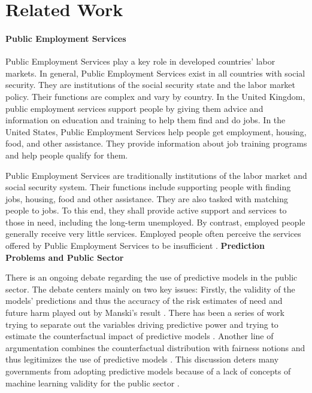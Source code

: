 \documentclass{article} %
\begin{document}
\section{Related Work}

\label{sec:relatedwork}
\paragraph{Public Employment Services}
Public Employment Services play a key role in developed countries' labor markets. In general, Public Employment Services exist in all countries with social security. They are institutions of the social security state and the labor market policy. Their functions are complex and vary by country. In the United Kingdom, public employment services support people by giving them advice and information on education and training to help them find and do jobs. In the United States, Public Employment Services help people get employment, housing, food, and other assistance. They provide information about job training programs and help people qualify for them.

Public Employment Services are traditionally institutions of the labor market and social security system. Their functions include supporting people with finding jobs, housing, food and other assistance. They are also tasked with matching people to jobs. To this end, they shall provide active support and services to those in need, including the long-term unemployed. By contrast, employed people generally receive very little services. Employed people often perceive the services offered by Public Employment Services to be insufficient \citep{kortner2023predictive}. 
\textbf{Prediction Problems and Public Sector}

There is an ongoing debate regarding the use of predictive models in the public sector. The debate centers mainly on two key issues: Firstly, the validity of the models' predictions and thus the accuracy of the risk estimates of need and future harm played out by Manski's result \citep{Manski2004}. There has been a series of work trying to separate out the variables driving predictive power and trying to estimate the counterfactual impact of predictive models \citep{Bach_Kern_Mautner_Kreuter_2023, chouldechova2018case, elmachtoub2022smart, jain2024position, shirali2024}. Another line of argumentation combines the counterfactual distribution with fairness notions and thus legitimizes the use of predictive models \citep{coston2023sat,Guerdan23,wang2024}. This discussion deters many governments from adopting predictive models because of a lack of concepts of machine learning validity for the public sector \citep{Bach_Kern_Mautner_Kreuter_2023}.
\end{document}

